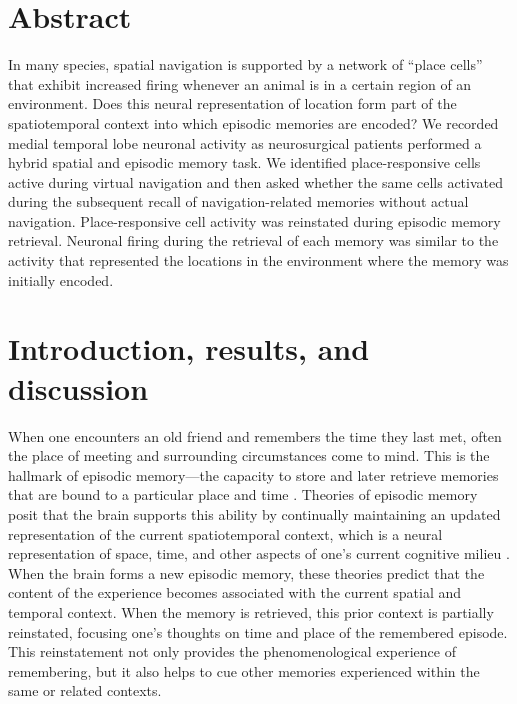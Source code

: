 
\section{Abstract}

In many species, spatial navigation is supported by a network of ``place cells'' that exhibit increased firing whenever an animal is in a certain region of an environment. Does this neural representation of location form part of the spatiotemporal context into which episodic memories are encoded? We recorded medial temporal lobe neuronal activity as neurosurgical patients performed a hybrid spatial and episodic memory task.  We identified place-responsive cells active during virtual navigation and then asked whether the same cells activated during the subsequent recall of navigation-related memories without actual navigation. Place-responsive cell activity was reinstated during episodic memory retrieval. Neuronal firing during the retrieval of each memory was  similar to the activity that represented the locations in the environment  where the memory was initially encoded.


\section{Introduction, results, and discussion}
When one encounters an old friend and remembers the time they last met, often the place of meeting and surrounding circumstances come to mind. This is the hallmark of episodic memory---the capacity to store and later retrieve memories that are bound to a particular place and time \cite{Tulv83}.  Theories of episodic memory posit that the brain supports this ability by continually maintaining an updated representation of the current spatiotemporal context, which is a neural representation of space, time, and other aspects of one's current cognitive milieu \cite{PolyKaha08}.  When the brain forms a new episodic memory, these theories predict that the content of the experience becomes associated with the current spatial and temporal context.  When the memory is retrieved, this prior context is partially reinstated, focusing one's thoughts on time and place of the remembered episode. This reinstatement not only provides the phenomenological experience of remembering, but it also helps to cue other memories experienced within the same or related contexts.

